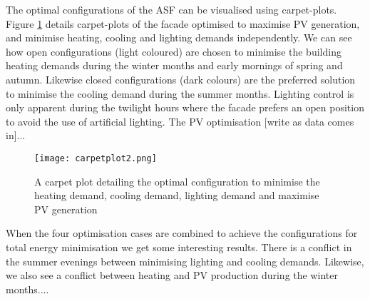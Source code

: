 


The optimal configurations of the ASF can be visualised using carpet-plots. Figure \ref{fig:carpetplot} details carpet-plots of the facade optimised to maximise PV generation, and minimise heating, cooling and lighting demands independently. We can see how open configurations (light coloured) are chosen to minimise the building heating demands during the winter months and early mornings of spring and autumn. Likewise closed configurations (dark colours) are the preferred solution to minimise the cooling demand during the summer months. Lighting control is only apparent during the twilight hours where the facade prefers an open position to avoid the use of artificial lighting. The PV optimisation [write as data comes in]...

\begin{figure}
\begin{center}
\texttt{[image: carpetplot2.png]}
\caption{A carpet plot detailing the optimal configuration to minimise the heating demand, cooling demand, lighting demand and maximise PV generation}
\label{fig:carpetplot}
\end{center}
\end{figure}

When the four optimisation cases are combined to achieve the configurations for total energy minimisation we get some interesting results. There is a conflict in the summer evenings between minimising lighting and cooling demands. Likewise, we also see a conflict between heating and PV production during the winter months....

